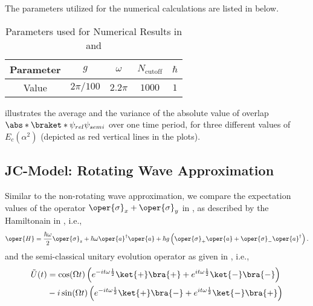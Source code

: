The parameters utilized for the numerical calculations are listed in  below.
\begin{table}[ht]
    \centering
    \label{tab:numerical_values_linear}
        \begin{tabular}{|c|c|c|c|c|}
            \hline
            Parameter & $g$ & $\omega$ & $N_{\text{cutoff}}$ & $\hbar$ \\
            \hline
            Value & $2\pi/100$ & $2.2\pi$ & $1000$ & $1$ \\
            \hline
        \end{tabular}
    \caption{Parameters used for Numerical Results in  and 
    }
\end{table}


 illustrates the average and the 
variance of the absolute value of overlap \(\abs*{\braket*{\psi_{rel}}{\psi_{semi}}}\) over one time period, 
for three different values of \(E_c(\alpha^2)\) (depicted as red vertical lines in the plots). 

\subsection*{JC-Model: Rotating Wave Approximation}

Similar to the non-rotating wave approximation, we compare the expectation values of the operator
\(\oper{\sigma}_x + \oper{\sigma}_y\) in , as described by the Hamiltonain in , i.e., 
\begin{eqnarray}
    \oper{H} = \frac{\hbar \omega}{2} \oper{\sigma}_z + \hbar \omega\oper{a}^\dagger \oper{a}
    + \hbar g \left(\oper{\sigma}_+ \oper{a} + \oper{\sigma}_- \oper{a}^\dagger\right).
\end{eqnarray}
and the semi-classical unitary evolution operator as given in , i.e.,
\begin{eqnarray}
    \tilde{U}(t) 
    &= \cos(\Omega t) \left(e^{-i t \omega \frac{1}{2}}\ket{+}\bra{+} + 
    e^{i t \omega \frac{1}{2}}\ket{-}\bra{-} \right)  \nonumber \\
    &- i \sin(\Omega t)
     \left( e^{-i t \omega \frac{1}{2}}\ket{+}\bra{-}
    + e^{i t \omega \frac{1}{2}}\ket{-}\bra{+}\right) 
\end{eqnarray}




